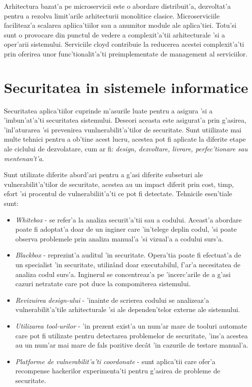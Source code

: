 \documentclass[12pt,a4paper,twoside]{report}
\begin{document}
Arhitectura bazat'a pe microservicii este o abordare distribuit'a, dezvoltat'a pentru a rezolva limit'arile arhitecturii monolitice clasice. Microserviciile faciliteaz'a scalarea apliica'tiilor sau a anumitor module ale aplica'tiei. Totu'si sunt o provocare din punctul de vedere a complexit'a'tii arhitecturale 'si a oper'arii sistemului. Serviciile cloyd contribuie la reducerea acestei complexit'a'ti prin oferirea unor func'tionalit'a'ti preimplementate de management al serviciilor.

\section{Securitatea in sistemele informatice}


Securitatea aplica'tiilor cuprinde m'asurile luate pentru a asigura 'si a 'imbun'at'a'ti securitatea sistemului. Deseori aceasta este asigurat'a prin g'asirea, 'inl'aturarea 'si prevenirea vunlnerabilit'a'tilor de securitate. Sunt utiilizate mai multe tehnici pentru a ob'tine acest lucru, acestea pot fi aplicate la diferite etape ale ciclului de dezvolatare, cum ar fi: \textit{design, dezvoltare, livrare, perfec'tionare sau mentenan't'a}.

Sunt utilizate diferite abord'ari pentru a g'asi diferite subseturi ale vulnerabilit'a'tilor de securitate, acestea au un impact diferit prin cost, timp, efort 'si procentul de vulnerabiliit'a'ti ce pot fi detectate. Tehnicile esen'tiale sunt:
\begin{itemize}
\item \textit{Whitebox} - se refer'a la analiza securit'a'tii sau a codului. Aceast'a abordare poate fi adoptat'a doar de un inginer care 'in'telege deplin codul, 'si poate observa problemele prin analiza manual'a 'si vizual'a a codului surs'a.
\item \textit{Blackbox} - reprezint'a auditul 'in securitate. Opera'tia poate fi efectuat'a de un specialist 'in securitate, utilizând doar executabilul, f'ar'a necesitatea de analiza codul surs'a. Inginerul se concentreaz'a pe 'incerc'arile de a g'asi cazuri netratate care pot duce la compomiterea sistemului.
\item \textit{Revizuirea design-ului} - 'inainte de scrierea codului se analizeaz'a vulnerabilit'a'tile arhitecturale 'si ale dependen'telor externe ale sistemului.
\item \textit{Utilizarea tool-urilor} - 'in prezent exist'a un num'ar mare de tooluri automate care pot fi utilizate pentru detectarea problemelor de securitate, 'ins'a acestea au un num'ar mai mare de fals pozitive decât 'in cazurile de testare manual'a.
\item \textit{Platforme de vulnerabilit'a'ti coordonate} - sunt aplica'tii care ofer'a recompense hackerilor experimenta'ti pentru g'asirea de probleme de securitate.
\end{itemize}
\end{document}
